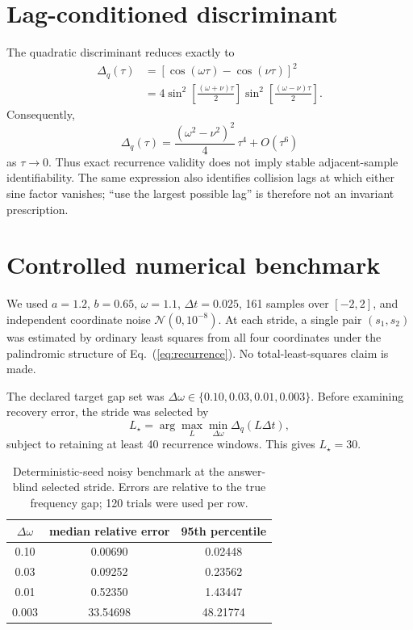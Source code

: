 \documentclass[aps,prd,preprint,nofootinbib]{revtex4-2}
\begin{document}
\section{Lag-conditioned discriminant}

The quadratic discriminant reduces exactly to
\begin{align}
\Delta_q(\tau)
&=
\left[\cos(\omega\tau)-\cos(\nu\tau)\right]^2\\
&=
4\sin^2\!\left[\frac{(\omega+\nu)\tau}2\right]
 \sin^2\!\left[\frac{(\omega-\nu)\tau}2\right].
\label{eq:disc}
\end{align}
Consequently,
\begin{equation}
\Delta_q(\tau)
=
\frac{(\omega^2-\nu^2)^2}4\,\tau^4
+O(\tau^6)
\end{equation}
as $\tau\rightarrow0$.
Thus exact recurrence validity does not imply stable adjacent-sample
identifiability. The same expression also identifies collision lags at which
either sine factor vanishes; ``use the largest possible lag'' is therefore
not an invariant prescription.

\section{Controlled numerical benchmark}

We used $a=1.2$, $b=0.65$, $\omega=1.1$, $\Delta t=0.025$,
161 samples over $[-2,2]$, and independent coordinate noise
$\mathcal N(0,10^{-8})$. At each stride, a single pair $(s_1,s_2)$ was
estimated by ordinary least squares from all four coordinates under the
palindromic structure of Eq.~(\ref{eq:recurrence}). No total-least-squares
claim is made.

The declared target gap set was
$\Delta\omega\in\{0.10,0.03,0.01,0.003\}$.
Before examining recovery error, the stride was selected by
\begin{equation}
L_\star=
\arg\max_L
\min_{\Delta\omega}
\Delta_q(L\Delta t),
\end{equation}
subject to retaining at least 40 recurrence windows. This gives
$L_\star=30$.

\begin{table}[b]
\caption{Deterministic-seed noisy benchmark at the answer-blind selected stride.
Errors are relative to the true frequency gap; 120 trials were used per row.}
\centering
\begin{ruledtabular}
\begin{tabular}{ccc}
$\Delta\omega$ & median relative error & 95th percentile\\
\hline
0.10  & 0.00690 & 0.02448\\
0.03  & 0.09252 & 0.23562\\
0.01  & 0.52350 & 1.43447\\
0.003 & 33.54698 & 48.21774\\
\end{tabular}
\end{ruledtabular}
\end{table}
\end{document}
